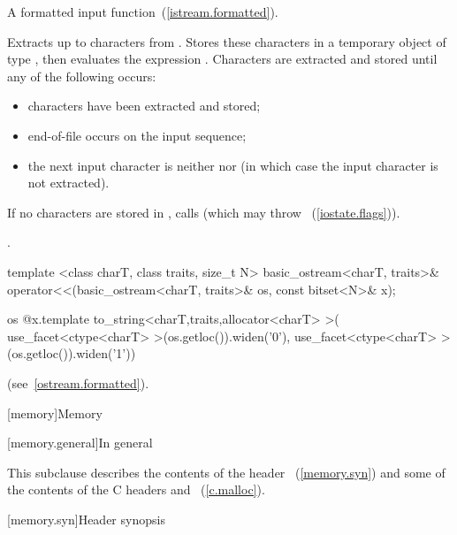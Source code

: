\begin{itemdescr}
\pnum
A formatted input function~(\ref{istream.formatted}).

\pnum
\effects
Extracts up to  characters from .
Stores these characters in a temporary object  of type
,
then evaluates the expression
.
Characters are extracted and stored until any of the following occurs:

\begin{itemize}
\item
{} characters have been extracted and stored;
\item
end-of-file occurs on the input sequence;%
\item
the next input character is neither
nor
(in which case the input character is not extracted).
\end{itemize}

\pnum
If no characters are stored in , calls
(which may throw
~(\ref{iostate.flags})).

\pnum
\returns
{}.
\end{itemdescr}

%
\begin{itemdecl}
template <class charT, class traits, size_t N>
  basic_ostream<charT, traits>&
  operator<<(basic_ostream<charT, traits>& os, const bitset<N>& x);
\end{itemdecl}

\begin{itemdescr}
\pnum
\returns
\begin{codeblock}
os @\shl@ x.template to_string<charT,traits,allocator<charT> >(
  use_facet<ctype<charT> >(os.getloc()).widen('0'),
  use_facet<ctype<charT> >(os.getloc()).widen('1'))
\end{codeblock}
(see~\ref{ostream.formatted}).
\end{itemdescr}

[memory]{Memory}

[memory.general]{In general}

\pnum
This subclause describes the contents of the header
~(\ref{memory.syn}) and some
of the contents of the C headers  and
~(\ref{c.malloc}).

[memory.syn]{Header  synopsis}

